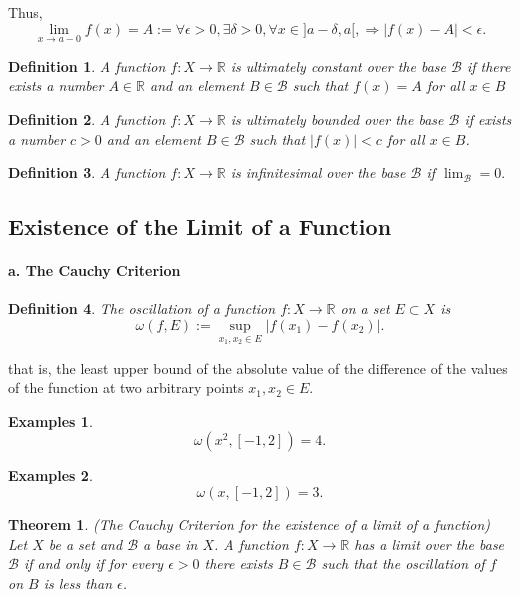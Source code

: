 \documentclass[a4paper,12pt]{article} %
\newtheorem{definition}{Definition}[section]
\newtheorem{theorem}{Theorem}[section]
\newtheorem{example}{Examples}
\begin{document}
Thus, 
\[
    \lim_{x \to a-0} f(x) = A := \forall \epsilon > 0, \exists \delta > 0, \forall x \in 
]a-\delta,a[, \Rightarrow |f(x) - A| < \epsilon.
\]

\begin{definition}
    A function $f: X \to \mathbb{R}$ is ultimately constant over the 
    base $\mathcal{B}$ if there exists a number $A \in \mathbb{R}$
    and an element $B \in \mathcal{B}$ such that $f(x) = A$ for all 
    $x \in B$
\end{definition}
\begin{definition}
    A function $f: X \to \mathbb{R}$ is ultimately bounded over the base 
    $\mathcal{B}$ if exists a number $c > 0$ and an element $B \in \mathcal{B}$
    such that $|f(x)| < c$ for all $x \in B$.
\end{definition}
\begin{definition}
    A function $f: X \to \mathbb{R}$ is infinitesimal over the base $\mathcal{B}$ 
    if $\displaystyle \lim_{\mathcal{B}} = 0.$ 
\end{definition}

\subsection{Existence of the Limit of a Function}
\paragraph{{\rm \textbf{a. The Cauchy Criterion}}}
\begin{definition}
    The oscillation of a function $f: X \to \mathbb{R}$ on a set $E \subset X$
    is 
    \[
        \omega(f, E) := \sup_{x_1,x_2 \in  E} \left|f(x_1)-f(x_2)\right|.
        \]
\end{definition}
that is, the least upper bound of the absolute value of the difference of 
the values of the function at two arbitrary points $x_1, x_2 \in E$.
\begin{example}
    \[
        \omega\left(x^2,[-1,2]\right) = 4.
        \]
\end{example}
\begin{example}
    \[
        \omega\left(x,[-1,2]\right) = 3.
        \]
\end{example}

\begin{theorem}{(The Cauchy Criterion for the existence of a limit of a function)}
    Let $X$ be a set and $\mathcal{B}$ a base in $X$. A function $f: X \to \mathbb{R}$
    has a limit over the base $\mathcal{B}$ if and only if for every $\epsilon > 0$
    there exists $B \in \mathcal{B}$ such that the oscillation of $f$ on 
    $B$ is less than $\epsilon$.
\end{theorem}
\end{document}
